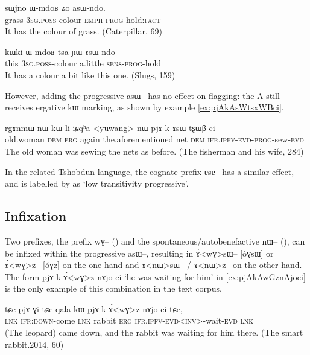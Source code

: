 \documentclass[oldfontcommands,oneside,a4paper,11pt]{article}
\newcommand{\ipa}[1]{{\phon \mbox{#1}}} %
\newcommand{\factual}[1]{\textsc{:fact}}
\begin{document}
\begin{exe}
\ex \label{ex:asWndo}
\gll
\ipa{sɯjno} 	\ipa{ɯ-mdoʁ} 	\ipa{ʑo} 	\ipa{asɯ-ndo.} \\
grass \textsc{3sg.poss}-colour \textsc{emph} \textsc{prog}-hold\factual{} \\
\glt It has the colour of grass. (Caterpillar, 69)
\end{exe}


\begin{exe}
\ex \label{ex:YAsWndo}
\gll
\ipa{kɯki} 	\ipa{ɯ-mdoʁ} 	\ipa{tsa} 	\ipa{ɲɯ-ɤsɯ-ndo} \\
this  \textsc{3sg.poss}-colour  a.little \textsc{sens-prog}-hold \\
\glt It has a colour a bit like this one. (Slugs, 159)
\end{exe}

However, adding the progressive \ipa{asɯ--} has no effect on flagging: the A still receives ergative \ipa{kɯ} marking, as shown by example \ref{ex:pjAkAsWtsxWBci}.

\begin{exe}
\ex \label{ex:pjAkAsWtsxWBci}
\gll
\ipa{rgɤnmɯ}  	\ipa{nɯ}  	\ipa{kɯ}  	\ipa{li}  	\ipa{iɕqʰa}  	<yuwang>	\ipa{nɯ}  	\ipa{pjɤ-k-ɤsɯ-tʂɯβ-ci}  		\\
old.woman \textsc{dem} \textsc{erg} again the.aforementioned net \textsc{dem} \textsc{ifr.ipfv-evd-prog}-sew-\textsc{evd} \\
\glt The old woman was sewing the nets as before. (The fisherman and his wife, 284)
\end{exe}


In the related Tshobdun language, the cognate prefix \ipa{ɐsɐ--} has a similar effect, and is labelled by \citet{jackson03caodeng} as `low transitivity progressive'.

\subsection{Infixation}
Two prefixes, the prefix \ipa{wɣ--} (\citealt{jacques10inverse}) and the spontaneous/autobenefactive \ipa{nɯ--}  (\citealt{jacques15spontaneous}), can be infixed within the progressive \ipa{asɯ--}, resulting in \ipa{ɤ́<wɣ>sɯ--} [\ipa{óɣsɯ}] or \ipa{ɤ́<wɣ>z--} [\ipa{óɣz}] on the one hand and  \ipa{ɤ<nɯ>sɯ--} / \ipa{ɤ<nɯ>z--} on the other hand. The form \ipa{pjɤ-k-ɤ́<wɣ>z-nɤjo-ci} `he was waiting for him' in \ref{ex:pjAkAwGznAjoci} is the only example of this combination in the text corpus.


\begin{exe}
\ex \label{ex:pjAkAwGznAjoci}
\gll
\ipa{tɕe} 	\ipa{pjɤ-ɣi} 	\ipa{tɕe} 	\ipa{qala} 	\ipa{kɯ} 	\ipa{pjɤ-k-ɤ́<wɣ>z-nɤjo-ci} 	\ipa{tɕe,} \\
\textsc{lnk} \textsc{ifr:down}-come \textsc{lnk} rabbit \textsc{erg} \textsc{ifr.ipfv-evd<inv>}-wait-\textsc{evd} \textsc{lnk} \\
\glt (The leopard) came down, and the rabbit was waiting for him there. (The smart rabbit.2014, 60)
\end{exe}
\end{document}

